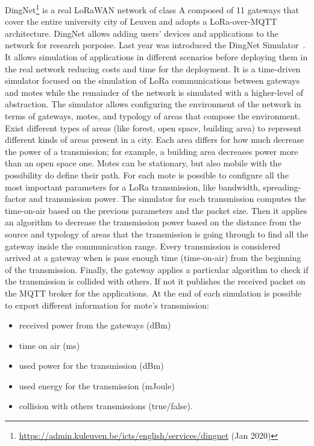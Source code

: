 DingNet\footnote{\href{https://admin.kuleuven.be/icts/english/services/dingnet}{https://admin.kuleuven.be/icts/english/services/dingnet} (Jan 2020)} is a real LoRaWAN network of class A composed of 11 gateways that cover the entire university city of Leuven and adopts a LoRa-over-MQTT architecture. 
% 
DingNet allows adding users' devices and applications to the network for research porpoise.
% 
Last year was introduced the DingNet Simulator~\cite{inproceedings}.
It allows simulation of applications in different scenarios before deploying them in the real network reducing costs and time for the deployment.
% 
It is a time-driven simulator focused on the simulation of LoRa communications between gateways and motes while the remainder of the network is simulated with a higher-level of abstraction. 
% 
The simulator allows configuring the environment of the network in terms of gateways, motes, and typology of areas that compose the environment. 
% 
Exist different types of areas (like forest, open space, building area) to represent different kinds of areas present in a city. 
Each area differs for how much decrease the power of a transmission; for example, a building area decreases power more than an open space one.
% 
Motes can be stationary, but also mobile with the possibility do define their path.
% 
For each mote is possible to configure all the most important parameters for a LoRa transmission, like bandwidth, spreading-factor and transmission power. 
% 
The simulator for each transmission computes the time-on-air based on the previous parameters and the packet size. 
% 
Then it applies an algorithm to decrease the transmission power based on the distance from the source and typology of areas that the transmission is going through to find all the gateway inside the communication range.
% 
Every transmission is considered arrived at a gateway when is pass enough time (time-on-air) from the beginning of the transmission. 
Finally, the gateway applies a particular algorithm to check if the transmission is collided with others. If not it publishes the received packet on the MQTT broker for the applications.
%
At the end of each simulation is possible to export different information for mote's transmission:
\begin{itemize}
    \item received power from the gateways (dBm)
    \item time on air (ms)
    \item used power for the transmission (dBm)
    \item used energy for the transmission (mJoule)
    \item collision with others transmissions (true/false).
\end{itemize}

